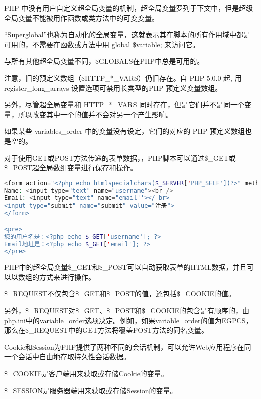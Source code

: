 PHP 中没有用户自定义超全局变量的机制，超全局变量罗列于下文中，但是超级全局变量不能被用作函数或类方法中的可变变量。



“Superglobal”也称为自动化的全局变量，这就表示其在脚本的所有作用域中都是可用的，不需要在函数或方法中用 global \$variable; 来访问它。



与所有其他超全局变量不同，\$GLOBALS在PHP中总是可用的。





注意，旧的预定义数组（\$HTTP\_*\_VARS）仍旧存在。自 PHP 5.0.0 起, 用 register\_long\_arrays 设置选项可禁用长类型的PHP 预定义变量数组。

另外，尽管超全局变量和 HTTP\_*\_VARS 同时存在，但是它们并不是同一个变量，所以改变其中一个的值并不会对另一个产生影响。

如果某些 variables\_order 中的变量没有设定，它们的对应的 PHP 预定义数组也是空的。

对于使用GET或POST方法传递的表单数据，，PHP脚本可以通过\$\_GET或\$\_POST超全局数组变量进行保存和操作。

\begin{lstlisting}[language=PHP]
<form action="<?php echo htmlspecialchars($_SERVER['PHP_SELF'])?>" method="get">
Name: <input type="text" name="username"><br />
Email: <input type="text" name="email''></ br>
<input type="submit" name="submit" value="注册">
</form>

<pre>
您的用户名是：<?php echo $_GET['username']; ?>
Email地址是：<?php echo $_GET['email']; ?>
</pre>
\end{lstlisting}

PHP中的超全局变量\$\_GET和\$\_POST可以自动获取表单的HTML数据，并且可以以数组的方式来进行操作。

\$\_REQUEST不仅包含\$\_GET和\$\_POST的值，还包括\$\_COOKIE的值。

另外，\$\_REQUEST对\$\_GET、\$\_POST和\$\_COOKIE的包含是有顺序的，由php.ini中的variable\_order选项决定。例如，如果variable\_order的值为EGPCS，那么在\$\_REQUEST中的GET方法将覆盖POST方法的同名变量。

Cookie和Session为PHP提供了两种不同的会话机制，可以允许Web应用程序在同一个会话中自由地存取持久性会话数据。

\begin{compactitem}
\item \$\_COOKIE是客户端用来获取或存储Cookie的变量。
\item \$\_SESSION是服务器端用来获取或存储Session的变量。
\end{compactitem}





